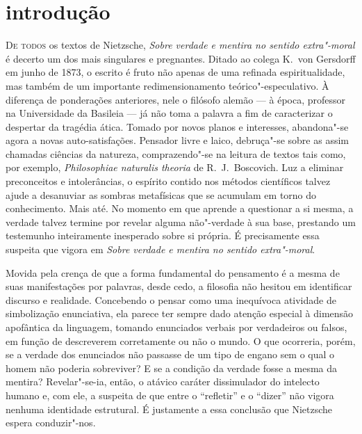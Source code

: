 \chapter[Introdução, por Fernando de Moraes Barros]{introdução}


\noindent\textsc{De todos} os textos de Nietzsche, \textit{Sobre verdade e mentira no sentido
extra"-moral} é decerto um dos mais singulares e pregnantes. Ditado ao
colega K.~von Gersdorff em junho de 1873, o escrito é fruto não apenas
de uma refinada espiritualidade, mas também de um importante
redimensionamento teórico"-especulativo. À diferença de ponderações
anteriores, nele o filósofo alemão --- à época, professor na Universidade
da Basileia --- já não toma a palavra a fim de caracterizar o despertar
da tragédia ática. Tomado por novos planos e interesses,
abandona"-se agora a novas auto{}-satisfações. Pensador livre e laico,
debruça"-se sobre as assim chamadas ciências da natureza,
comprazendo"-se na leitura de textos tais como, por exemplo,
\textit{Philosophiae naturalis theoria} de R.~J.~Boscovich. Luz a
eliminar preconceitos e intolerâncias, o espírito contido nos métodos científicos
talvez ajude a desanuviar as sombras metafísicas que se acumulam em
torno do conhecimento. Mais até. No momento em que aprende a questionar
a si mesma, a verdade talvez termine por revelar alguma não"-verdade à
sua base, prestando um testemunho inteiramente inesperado sobre si
própria. É precisamente essa suspeita que vigora em \textit{Sobre
verdade e mentira no sentido extra"-moral}.

Movida pela crença de que a forma fundamental do pensamento é a mesma
de suas manifestações por palavras, desde cedo, a filosofia não hesitou em
identificar discurso e realidade. Concebendo o pensar como uma
inequívoca atividade de simbolização enunciativa, ela parece ter sempre
dado atenção especial à dimensão apofântica da linguagem, tomando
enunciados verbais por verdadeiros ou falsos, em função de descreverem
corretamente ou não o mundo. O que ocorreria, porém, se a verdade dos
enunciados não passasse de um tipo de engano sem o qual o homem não
poderia sobreviver? E se a condição da verdade fosse a mesma da
mentira? Revelar"-se{}-ia, então, o atávico caráter dissimulador do
intelecto humano e, com ele, a suspeita de que entre o “refletir” e o
“dizer” não vigora nenhuma identidade estrutural. É justamente a essa
conclusão que Nietzsche espera conduzir"-nos.


